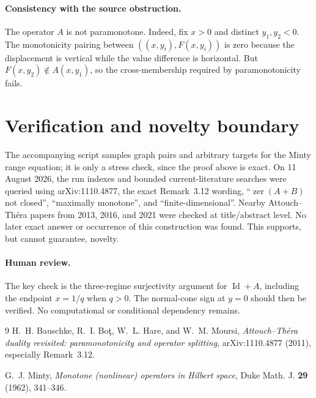 \documentclass[11pt]{article}
\newcommand{\zer}{\operatorname{zer}}
\newcommand{\Id}{\operatorname{Id}}
\begin{document}
\paragraph{Consistency with the source obstruction.}
The operator $A$ is not paramonotone.  Indeed, fix $x>0$ and distinct
$y_1,y_2<0$.  The monotonicity pairing between
$((x,y_i),F(x,y_i))$ is zero because the displacement is vertical while the
value difference is horizontal.  But $F(x,y_2)\notin A(x,y_1)$, so the
cross-membership required by paramonotonicity fails.

\section{Verification and novelty boundary}

The accompanying script samples graph pairs and arbitrary targets for the
Minty range equation; it is only a stress check, since the proof above is
exact.  On 11 August 2026, the run indexes and bounded current-literature
searches were queried using arXiv:1110.4877, the exact Remark~3.12 wording,
``$\zer(A+B)$ not closed'', ``maximally monotone'', and
``finite-dimensional''.  Nearby Attouch--Th\'era papers from 2013, 2016, and
2021 were checked at title/abstract level.  No later exact answer or occurrence
of this construction was found.  This supports, but cannot guarantee,
novelty.

\paragraph{Human review.}
The key check is the three-regime surjectivity argument for $\Id+A$, including
the endpoint $x=1/q$ when $q>0$.  The normal-cone sign at $y=0$ should then be
verified.  No computational or conditional dependency remains.

\begin{thebibliography}{9}
H.~H. Bauschke, R.~I. Bo\c{t}, W.~L. Hare, and W.~M. Moursi,
\emph{Attouch--Th\'era duality revisited: paramonotonicity and operator
splitting}, arXiv:1110.4877 (2011), especially Remark~3.12.

G.~J. Minty,
\emph{Monotone (nonlinear) operators in Hilbert space},
Duke Math. J. \textbf{29} (1962), 341--346.
\end{thebibliography}
\end{document}
